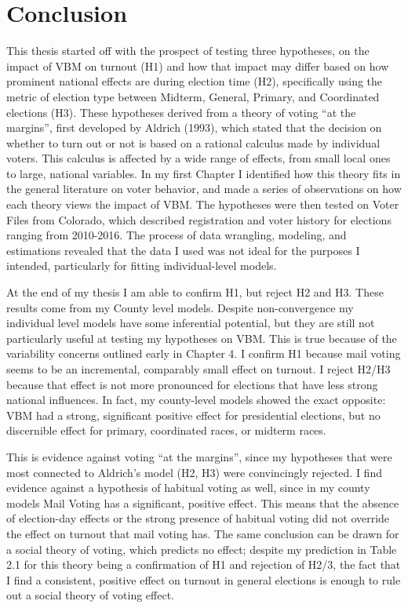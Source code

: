 \documentclass[12pt,twoside]{reedthesis}
\begin{document}
  \chapter*{Conclusion}\label{conclusion}
  
  \setcounter{chapter}{5} \setcounter{section}{0}
  
  This thesis started off with the prospect of testing three hypotheses,
  on the impact of VBM on turnout (H1) and how that impact may differ
  based on how prominent national effects are during election time (H2),
  specifically using the metric of election type between Midterm, General,
  Primary, and Coordinated elections (H3). These hypotheses derived from a
  theory of voting ``at the margins'', first developed by Aldrich (1993),
  which stated that the decision on whether to turn out or not is based on
  a rational calculus made by individual voters. This calculus is affected
  by a wide range of effects, from small local ones to large, national
  variables. In my first Chapter I identified how this theory fits in the
  general literature on voter behavior, and made a series of observations
  on how each theory views the impact of VBM. The hypotheses were then
  tested on Voter Files from Colorado, which described registration and
  voter history for elections ranging from 2010-2016. The process of data
  wrangling, modeling, and estimations revealed that the data I used was
  not ideal for the purposes I intended, particularly for fitting
  individual-level models.
  
  At the end of my thesis I am able to confirm H1, but reject H2 and H3.
  These results come from my County level models. Despite non-convergence
  my individual level models have some inferential potential, but they are
  still not particularly useful at testing my hypotheses on VBM. This is
  true because of the variability concerns outlined early in Chapter 4. I
  confirm H1 because mail voting seems to be an incremental, comparably
  small effect on turnout. I reject H2/H3 because that effect is not more
  pronounced for elections that have less strong national influences. In
  fact, my county-level models showed the exact opposite: VBM had a
  strong, significant positive effect for presidential elections, but no
  discernible effect for primary, coordinated races, or midterm races.
  
  This is evidence against voting ``at the margins'', since my hypotheses
  that were most connected to Aldrich's model (H2, H3) were convincingly
  rejected. I find evidence against a hypothesis of habitual voting as
  well, since in my county models Mail Voting has a significant, positive
  effect. This means that the absence of election-day effects or the
  strong presence of habitual voting did not override the effect on
  turnout that mail voting has. The same conclusion can be drawn for a
  social theory of voting, which predicts no effect; despite my prediction
  in Table 2.1 for this theory being a confirmation of H1 and rejection of
  H2/3, the fact that I find a consistent, positive effect on turnout in
  general elections is enough to rule out a social theory of voting
  effect.
  
\end{document}
